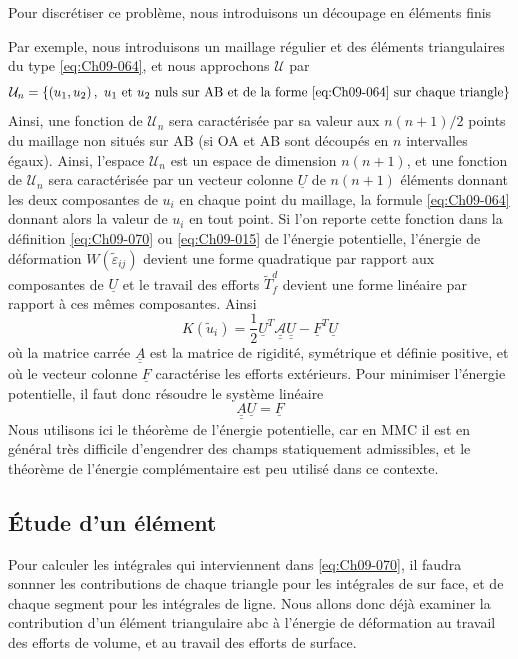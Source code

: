 Pour discrétiser ce problème, nous introduisons un découpage en éléments finis 

Par exemple, nous introduisons un maillage régulier et des éléments triangulaires du type \eqref{eq:Ch09-064}, et nous approchons $\mathcal{U}$ par
\[
\mathcal{U}_n = \left\{ \left( u_1, u_2 \right),\ u_1 \text{ et } u_2\ \text{nuls sur AB et de la forme~\eqref{eq:Ch09-064} sur chaque triangle} \right\}
\]
Ainsi, une fonction de $\mathcal{U}_n$ sera caractérisée par sa valeur aux $n(n+1)/2$ points du maillage non situés sur AB (si OA et AB sont découpés en $n$ intervalles égaux).
Ainsi, l'espace $\mathcal{U}_n$ est un espace de dimension $n(n+1)$, et une fonction de $\mathcal{U}_n$ sera caractérisée par un vecteur colonne $\underline{U}$ de $n(n+1)$ éléments donnant les deux composantes de $u_i$ en chaque point du maillage, la formule \eqref{eq:Ch09-064} donnant alors la valeur de $u_i$ en tout point.
Si l'on reporte cette fonction dans la définition \eqref{eq:Ch09-070} ou \eqref{eq:Ch09-015} de l'énergie potentielle, l'énergie de déformation $W\left( \tilde{\varepsilon}_{ij} \right)$ devient une forme quadratique par rapport aux composantes de $\underline{U}$ et le travail des efforts $\tilde{T}_f^d$ devient une forme linéaire par rapport à ces mêmes composantes.
Ainsi 
\begin{equation}
    K \left( \tilde{u}_i \right) = \frac{1}{2} \underline{U}^T \underline{\underline{\mathcal{A}}} \underline{\underline{U}} - \underline{F}^T \underline{U}
    \label{eq:Ch09-071}
\end{equation}
où la matrice carrée $\underline{\underline{A}}$ est la matrice de rigidité, symétrique et définie positive, et où le vecteur colonne $\underline{F}$ caractérise les efforts extérieurs.
Pour minimiser l'énergie potentielle, il faut donc résoudre le système 
linéaire 
\begin{equation}
    \underline{\underline{A}} \underline{U} = \underline{F}
    \label{eq:Ch09-072}
\end{equation}
Nous utilisons ici le théorème de l'énergie potentielle, car en 
MMC il est en général très difficile d'engendrer des champs statiquement admissibles, et le théorème de l'énergie complémentaire est peu utilisé dans ce contexte. 
\subsection{Étude d'un élément} \label{ssec:Ch09-3.3}
Pour calculer les intégrales qui interviennent dans \eqref{eq:Ch09-070}, il faudra sonnner les contributions de chaque triangle pour les intégrales de sur face, et de chaque segment pour les intégrales de ligne.
Nous allons donc déjà examiner la contribution d'un élément triangulaire abc à l'énergie de déformation au travail des efforts de volume, et au travail des efforts de surface. 

